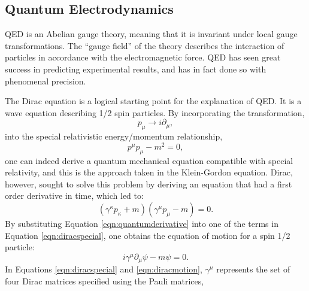 \subsection{Quantum Electrodynamics}
\label{sec:qed}
QED is an Abelian gauge theory, meaning that it is invariant under local gauge transformations.
The ``gauge field'' of the theory describes the interaction of particles in accordance with the electromagnetic force.
QED has seen great success in predicting experimental results, and has in fact done so with phenomenal precision.

The Dirac equation is a logical starting point for the explanation of QED. 
It is a wave equation describing 1/2 spin particles.
By incorporating the transformation,
\begin{equation}
\label{eqn:quantumderivative}
p_{\mu} \rightarrow i\partial_{\mu},
\end{equation}
into the special relativistic energy/momentum relationship,
\begin{equation}
p^{\mu}p_{\mu} - m^{2} = 0,
\end{equation}
one can indeed derive a quantum mechanical equation compatible with special relativity, and this is the approach taken in the Klein-Gordon equation.
Dirac, however, sought to solve this problem by deriving an equation that had a first order derivative in time, which led to:
\begin{equation}
\label{eqn:diracspecial}
(\gamma^{\kappa}p_{\kappa} + m)(\gamma^{\mu}p_{\mu} -m) = 0.
\end{equation}
By substituting Equation \ref{eqn:quantumderivative} into one of the terms in Equation \ref{eqn:diracspecial}, one obtains the equation of motion for a spin 1/2 particle:
\begin{equation}
\label{eqn:diracmotion}
i\gamma^{\mu}\partial_{\mu}\psi - m\psi = 0.
\end{equation}
In Equations \ref{eqn:diracspecial} and \ref{eqn:diracmotion}, $\gamma^{\mu}$ represents the set of four Dirac matrices specified using the Pauli matrices,
